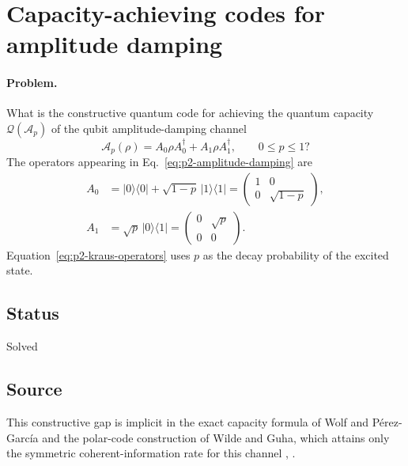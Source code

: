 \section{Capacity-achieving codes for amplitude damping}
\label{sec:op_fcd21a1a5021e464}

\paragraph{Problem.}
What is the constructive quantum code for achieving the quantum capacity
$\mathcal{Q}(\mathcal A_p)$ of the qubit amplitude-damping channel
\begin{equation}
  \mathcal A_p(\rho)=A_0\rho A_0^\dagger+A_1\rho A_1^\dagger,
  \qquad 0\le p\le1?
  \label{eq:p2-amplitude-damping}
\end{equation}
The operators appearing in Eq.~\eqref{eq:p2-amplitude-damping} are
\begin{equation}
  \begin{aligned}
    A_0&=\lvert0\rangle\!\langle0\rvert
         +\sqrt{1-p}\,\lvert1\rangle\!\langle1\rvert
       =\begin{pmatrix}1&0\\0&\sqrt{1-p}\end{pmatrix},\\
    A_1&=\sqrt p\,\lvert0\rangle\!\langle1\rvert
       =\begin{pmatrix}0&\sqrt p\\0&0\end{pmatrix}.
  \end{aligned}
  \label{eq:p2-kraus-operators}
\end{equation}
Equation~\eqref{eq:p2-kraus-operators} uses $p$ as the decay probability of
the excited state.

\subsection*{Status}

Solved

\subsection*{Source}

This constructive gap is implicit in the exact capacity formula of Wolf and
P\'erez-Garc\'ia and the polar-code construction of Wilde and Guha, which
attains only the symmetric coherent-information rate for this channel
,
.

